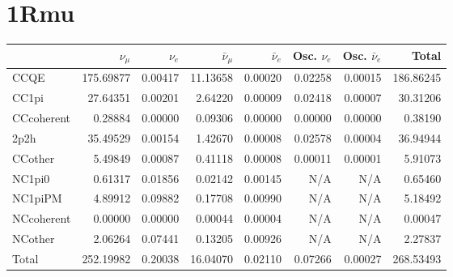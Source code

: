 \documentclass[10pt,a4paper]{article}
\begin{document}
\section*{1Rmu}
\begin{tabular} { | l ||r | r | r | r | r | r | | r | }
\hline
              & $\nu_\mu$            & $\nu_e$              & $\bar{\nu}_{\mu}$    & $\bar{\nu}_{e}$      & Osc. $\nu_e$         & Osc. $\bar{\nu}_{e}$ & Total                \\ \hline\hline
 CCQE         & 175.69877            & 0.00417              & 11.13658             & 0.00020              & 0.02258              & 0.00015              & 186.86245            \\ \hline
 CC1pi        & 27.64351             & 0.00201              & 2.64220              & 0.00009              & 0.02418              & 0.00007              & 30.31206             \\ \hline
 CCcoherent   & 0.28884              & 0.00000              & 0.09306              & 0.00000              & 0.00000              & 0.00000              & 0.38190              \\ \hline
 2p2h         & 35.49529             & 0.00154              & 1.42670              & 0.00008              & 0.02578              & 0.00004              & 36.94944             \\ \hline
 CCother      & 5.49849              & 0.00087              & 0.41118              & 0.00008              & 0.00011              & 0.00001              & 5.91073              \\ \hline
 NC1pi0       & 0.61317              & 0.01856              & 0.02142              & 0.00145              & N/A                  & N/A                  & 0.65460              \\ \hline
 NC1piPM      & 4.89912              & 0.09882              & 0.17708              & 0.00990              & N/A                  & N/A                  & 5.18492              \\ \hline
 NCcoherent   & 0.00000              & 0.00000              & 0.00044              & 0.00004              & N/A                  & N/A                  & 0.00047              \\ \hline
 NCother      & 2.06264              & 0.07441              & 0.13205              & 0.00926              & N/A                  & N/A                  & 2.27837              \\ \hline
\hline
 Total        & 252.19982            & 0.20038              & 16.04070             & 0.02110              & 0.07266              & 0.00027              & 268.53493            \\ \hline

\end{tabular}
\end{document}
